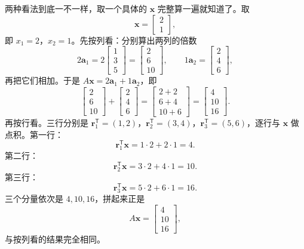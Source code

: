 \documentclass[UTF8,a4paper,12pt]{ctexart}
\numberwithin{equation}{section}
\newcommand{\trans}{^{\mathsf T}}
\begin{document}
	两种看法到底一不一样，取一个具体的 $\bm{x}$ 完整算一遍就知道了。取
	\begin{equation}\label{eq:3.10}
	\bm{x}=
	\begin{bmatrix}
		2\\1
	\end{bmatrix},
	\end{equation}
	即 $x_1=2$，$x_2=1$。先按列看：分别算出两列的倍数
	\begin{equation}\label{eq:3.11}
	2\bm{a}_1
	=
	2
	\begin{bmatrix}
		1\\3\\5
	\end{bmatrix}
	=
	\begin{bmatrix}
		2\\6\\10
	\end{bmatrix},
	\qquad
	1\bm{a}_2
	=
	\begin{bmatrix}
		2\\4\\6
	\end{bmatrix},
	\end{equation}
	再把它们相加。于是 $A\bm{x}=2\bm{a}_1+1\bm{a}_2$，即
	\begin{equation}\label{eq:3.12}
	\begin{bmatrix}
		2\\6\\10
	\end{bmatrix}
	+
	\begin{bmatrix}
		2\\4\\6
	\end{bmatrix}
	=
	\begin{bmatrix}
		2+2\\6+4\\10+6
	\end{bmatrix}
	=
	\begin{bmatrix}
		4\\10\\16
	\end{bmatrix}.
	\end{equation}
	再按行看。三行分别是 $\bm{r}_1\trans=(1,2)$，$\bm{r}_2\trans=(3,4)$，$\bm{r}_3\trans=(5,6)$，逐行与 $\bm{x}$ 做点积。第一行：
	\begin{equation}\label{eq:3.13}
	\bm{r}_1\trans\bm{x}=1\cdot2+2\cdot1=4.
	\end{equation}
	第二行：
	\begin{equation}\label{eq:3.14}
	\bm{r}_2\trans\bm{x}=3\cdot2+4\cdot1=10.
	\end{equation}
	第三行：
	\begin{equation}\label{eq:3.15}
	\bm{r}_3\trans\bm{x}=5\cdot2+6\cdot1=16.
	\end{equation}
	三个分量依次是 $4,10,16$，拼起来正是
	\begin{equation}\label{eq:3.16}
	A\bm{x}=
	\begin{bmatrix}
		4\\10\\16
	\end{bmatrix},
	\end{equation}
	与按列看的结果完全相同。
	
\end{document}
